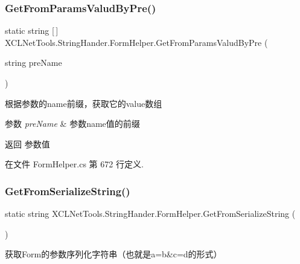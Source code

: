 \subsubsection{\texorpdfstring{Get\+From\+Params\+Valud\+By\+Pre()}{GetFromParamsValudByPre()}}
{\footnotesize\ttfamily static string \mbox{[}$\,$\mbox{]} X\+C\+L\+Net\+Tools.\+String\+Hander.\+Form\+Helper.\+Get\+From\+Params\+Valud\+By\+Pre (\begin{DoxyParamCaption}\item[{string}]{pre\+Name }\end{DoxyParamCaption})\hspace{0.3cm}{\ttfamily [static]}}



根据参数的name前缀，获取它的value数组 


\begin{DoxyParams}{参数}
{\em pre\+Name} & 参数name值的前缀\\
\hline
\end{DoxyParams}
\begin{DoxyReturn}{返回}
参数值
\end{DoxyReturn}


在文件 Form\+Helper.\+cs 第 672 行定义.

\mbox{\label{class_x_c_l_net_tools_1_1_string_hander_1_1_form_helper_aa8048660a078480db6e41f2f3050c651}} 
\subsubsection{\texorpdfstring{Get\+From\+Serialize\+String()}{GetFromSerializeString()}}
{\footnotesize\ttfamily static string X\+C\+L\+Net\+Tools.\+String\+Hander.\+Form\+Helper.\+Get\+From\+Serialize\+String (\begin{DoxyParamCaption}{ }\end{DoxyParamCaption})\hspace{0.3cm}{\ttfamily [static]}}



获取\+Form的参数序列化字符串（也就是a=b\&c=d的形式） 

